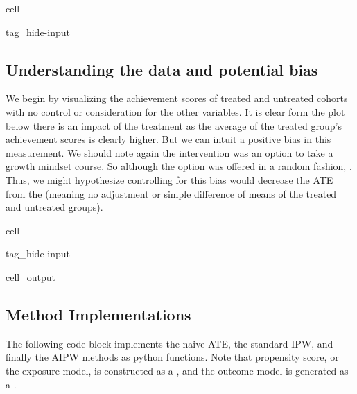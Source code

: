 \documentclass[letterpaper,10pt,english]{jupyterBook}
\begin{document}
\begin{sphinxuseclass}{cell}
\begin{sphinxuseclass}{tag_hide-input}
\end{sphinxuseclass}
\end{sphinxuseclass}

\subsection{Understanding the data and potential bias}
\label{\detokenize{DR_Methods:understanding-the-data-and-potential-bias}}
\sphinxAtStartPar
We begin by visualizing the achievement scores of treated and untreated cohorts with no control or consideration for the other variables. It is clear form the plot below there is an impact of the treatment as the average of the treated group’s achievement scores is clearly higher. But we can intuit a positive bias in this measurement. We should note again the intervention was an option to take a growth mindset course. So although the option was offered in a random fashion, . Thus, we might hypothesize controlling for this bias would decrease the ATE from the  (meaning no adjustment or simple difference of means of the treated and untreated groups).

\begin{sphinxuseclass}{cell}
\begin{sphinxuseclass}{tag_hide-input}\begin{sphinxVerbatimOutput}

\begin{sphinxuseclass}{cell_output}
\noindent{}

\end{sphinxuseclass}\end{sphinxVerbatimOutput}

\end{sphinxuseclass}
\end{sphinxuseclass}

\subsection{Method Implementations}
\label{\detokenize{DR_Methods:method-implementations}}
\sphinxAtStartPar
The following code block implements the naive ATE, the standard IPW, and finally the AIPW methods as python functions. Note that propensity score, or the exposure model, is constructed as a , and the outcome model is generated as a .
\end{document}
